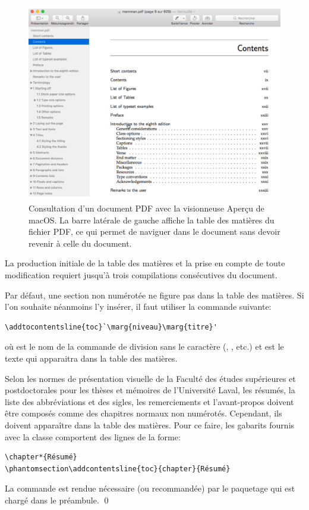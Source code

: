 \begin{figure}
  \centering
  \includegraphics[width=0.7\linewidth,angle=-90]{tdm-dans-pdf}
  \caption{Consultation d'un document PDF avec la visionneuse Aperçu
    de macOS. La barre latérale de gauche affiche la table des
    matières du fichier PDF, ce qui permet de naviguer dans le
    document sans devoir revenir à celle du document.}
  \label{fig:organisation:tdm-dans-pdf}
\end{figure}

\begin{important}
  La production initiale de la table des matières et la prise en
  compte de toute modification requiert jusqu'à trois compilations
  consécutives du document.
\end{important}

Par défaut, une section non numérotée ne figure pas dans la table des
matières. Si l'on souhaite néanmoins l'y insérer, il faut utiliser la
commande suivante:
\begin{lstlisting}
\addtocontentsline{toc}`\marg{niveau}\marg{titre}'
\end{lstlisting}
où  est le nom de la commande de division sans le
caractère {\bs} (, , etc.) et 
est le texte qui apparaitra dans la table des matières.

\begin{exemple}
  Selon les normes de présentation visuelle de la Faculté des études
  supérieures et postdoctorales pour les thèses et mémoires de
  l'Université Laval, les résumés, la liste des abbréviations et des
  sigles, les remerciements et l'avant-propos doivent être composés
  comme des chapitres normaux non numérotés. Cependant, ils doivent
  apparaître dans la table des matières. Pour ce faire, les gabarits
  fournis avec la classe  comportent des lignes de la
  forme:
\begin{lstlisting}
\chapter*{Résumé}
\phantomsection\addcontentsline{toc}{chapter}{Résumé}
\end{lstlisting}
  La commande  est rendue nécessaire (ou
  recommandée) par le paquetage  qui est chargé dans le
  préambule. %
  \qed
\end{exemple}

